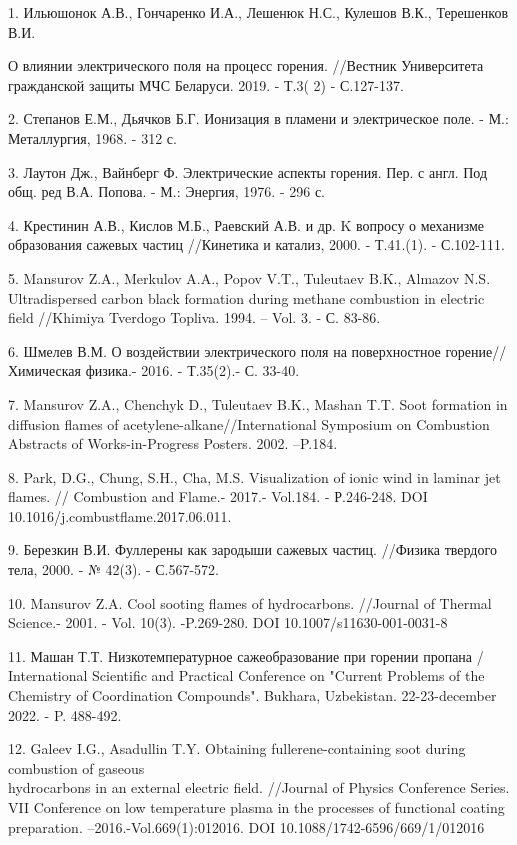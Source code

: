 \begin{noparindent}
1. Ильюшонок А.В., Гончаренко И.А., Лешенюк Н.С., Кулешов В.К.,
Терешенков В.И.

О влиянии электрического поля на процесс горения. //Вестник Университета
гражданской защиты МЧС Беларуси. 2019. - Т.3( 2) - С.127-137.

2. Степанов Е.М., Дьячков Б.Г. Ионизация в пламени и электрическое поле.
- М.: Металлургия, 1968. - 312 с.

3. Лаутон Дж., Вайнберг Ф. Электрические аспекты горения. Пер. с англ.
Под общ. ред В.А. Попова. - М.: Энергия, 1976. - 296 с.

4. Крестинин А.В., Кислов М.Б., Раевский А.В. и др. K вопросу о
механизме образования сажевых частиц //Кинетика и катализ, 2000. -
Т.41.(1). - С.102-111.

5. Mansurov Z.A., Merkulov A.A., Popov V.T., Tuleutaev B.K., Almazov
N.S. Ultradispersed carbon black formation during methane combustion in
electric field //Khimiya Tverdogo Topliva. 1994. -- Vol. 3. - С. 83-86.

6. Шмелев В.М. О воздействии электрического поля на поверхностное
горение//Химическая физика.- 2016. - Т.35(2).- С. 33-40.

7. Mansurov Z.A., Chenchyk D., Tuleutaev B.K., Mashan T.T. Soot
formation in diffusion flames of acetylene-alkane//International
Symposium on Combustion Abstracts of Works-in-Progress Posters. 2002.
--P.184.

8. Park, D.G., Chung, S.H., Cha, M.S. Visualization of ionic wind in
laminar jet flames. // Combustion and Flame.- 2017.- Vol.184. -
Р.246-248. DOI 10.1016/j.combustflame.2017.06.011.

9. Березкин В.И. Фуллерены как зародыши сажевых частиц. //Физика
твердого тела, 2000. - № 42(3). - С.567-572.

10. Mansurov Z.A. Cool sooting flames of hydrocarbons. //Journal of
Thermal Science.- 2001. - Vol. 10(3). -P.269-280. DOI
10.1007/s11630-001-0031-8

11. Машан Т.Т. Низкотемпературное сажеобразование при горении пропана /
International Scientific and Practical Conference on "Current Problems
of the Chemistry of Coordination Compounds". Bukhara, Uzbekistan.
22-23-december 2022. - P. 488-492.

12. Galeev I.G., Asadullin T.Y. Obtaining fullerene-containing soot
during combustion of gaseous \\hydrocarbons in an external electric field.
//Journal of Physics Conference Series. VII Conference on low
temperature plasma in the processes of functional coating preparation.
--2016.-Vol.669(1):012016. DOI 10.1088/1742-6596/669/1/012016
\end{noparindent}

